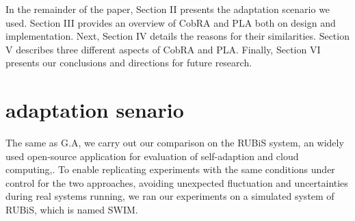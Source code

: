 \documentclass[sigconf]{acmart}
\begin{document}
In the remainder of the paper, Section II presents the adaptation scenario we used. Section III provides an overview of CobRA and PLA both on design and implementation. Next, Section IV details the reasons for their similarities. Section V describes three different aspects of CobRA and PLA. Finally, Section VI presents our conclusions and directions for future research.
\section{adaptation senario}
The same as G.A, we carry out our comparison on the RUBiS system\cite{rubis}, an widely used open-source application for evaluation of self-adaption and cloud computing\cite{rubis-1},\cite{rubis-2}. To enable replicating experiments with the same conditions under control for the two approaches, avoiding unexpected fluctuation and uncertainties during real systems running, we ran our experiments on a simulated system of RUBiS, which is named SWIM\cite{swim}.
\end{document}
